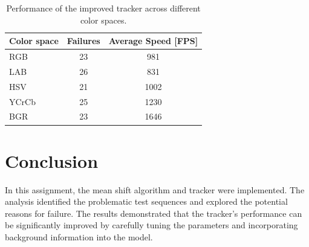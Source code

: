 \documentclass[9pt]{IEEEtran}
\begin{document}
   \begin{table}[h]
    \centering
    \caption{Performance of the improved tracker across different color spaces.}
    \begin{tabular}{lcc}
    \hline
    \textbf{Color space} & \textbf{Failures} & \textbf{Average Speed [FPS]} \\ 
    \hline
    RGB                 & 23                & 981                  \\ 
    LAB                 & 26                & 831                  \\ 
    HSV                 & 21                & 1002                 \\ 
    YCrCb               & 25                & 1230                 \\ 
    BGR                 & 23                & 1646                 \\ 
    \hline
    \end{tabular}

    \label{tab:color_spaces_results}
    \end{table}
    

\section{Conclusion}
In this assignment, the mean shift algorithm and tracker were implemented.
 The analysis identified the problematic test sequences and explored the potential reasons for failure.
  The results demonstrated that the tracker’s performance can be significantly improved by carefully tuning the 
  parameters and incorporating background information into the model.


\end{document}

